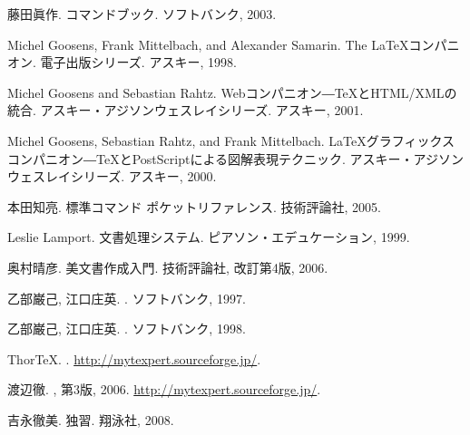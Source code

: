 \begin{thebibliography}{1}

藤田眞作.
\newblock {\LaTeXe}コマンドブック.
\newblock ソフトバンク, 2003.

Michel Goosens, Frank Mittelbach, and Alexander Samarin.
\newblock The {\LaTeX }コンパニオン.
\newblock 電子出版シリーズ. アスキー, 1998.

Michel Goosens and Sebastian Rahtz.
\newblock {\LaTeX} Webコンパニオン―{\TeX}とHTML/XMLの統合.
\newblock アスキー・アジソンウェスレイシリーズ. アスキー, 2001.

Michel Goosens, Sebastian Rahtz, and Frank Mittelbach.
\newblock
{\LaTeX}グラフィックスコンパニオン―{\TeX}とPostScriptによる図解表現テクニック.
\newblock アスキー・アジソンウェスレイシリーズ. アスキー, 2000.

本田知亮.
\newblock {\LaTeXe}標準コマンド ポケットリファレンス.
\newblock 技術評論社, 2005.

Leslie Lamport.
\newblock 文書処理システム{\LaTeXe}.
\newblock ピアソン・エデュケーション, 1999.

奥村晴彦.
\newblock [改訂第4版] {\LaTeXe}美文書作成入門.
\newblock 技術評論社, 改訂第4版, 2006.

乙部巌己, 江口庄英.
.
\newblock ソフトバンク, 1997.

乙部巌己, 江口庄英.
.
\newblock ソフトバンク, 1998.

{Thor\TeX}.
.
\newblock \url{http://mytexpert.sourceforge.jp/}.

渡辺徹.
, 第3版, 2006.
\newblock \url{http://mytexpert.sourceforge.jp/}.

吉永徹美.
\newblock 独習{\LaTeXe}.
\newblock 翔泳社, 2008.

\end{thebibliography}

\endinput

\nocite * 
 {jplain}
 \jobname
